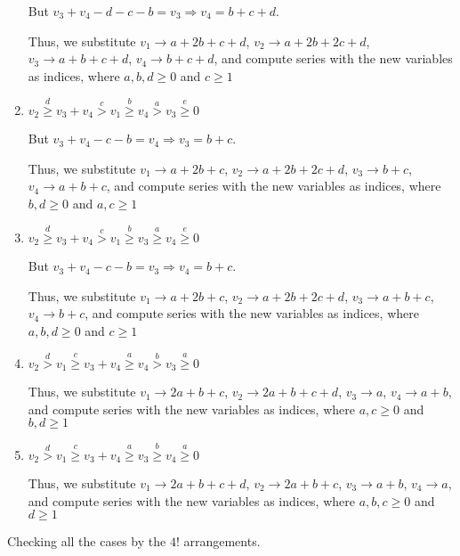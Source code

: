\documentclass{article}
\begin{document}
\begin{enumerate}
But $v_3+v_4-d-c-b=v_3\Rightarrow{v_4=b+c+d}.$

Thus, we substitute $v_1\rightarrow{a+2b+c+d}$, $v_2\rightarrow{a+2b+2c+d}$, $v_3\rightarrow{a+b+c+d}$, $v_4\rightarrow{b+c+d}$, and compute series with the new variables as indices, where $a,b,d\geq{0}$ and $c\geq{1}$
    \item 
$v_2\overset{d}{\geq}v_3+v_4\overset{c}{>}v_1\overset{b}{\geq}{v_4}\overset{a}{>}v_3\overset{e}{\geq}{0}$

But $v_3+v_4-c-b=v_4\Rightarrow{v_3=b+c}.$

Thus, we substitute $v_1\rightarrow{a+2b+c}$, $v_2\rightarrow{a+2b+2c+d}$, $v_3\rightarrow{b+c}$, $v_4\rightarrow{a+b+c}$, and compute series with the new variables as indices, where $b,d\geq{0}$ and $a,c\geq{1}$
    \item 
$v_2\overset{d}{\geq}v_3+v_4\overset{c}{>}v_1\overset{b}{\geq}{v_3}\overset{a}{\geq}v_4\overset{e}{\geq}{0}$

But $v_3+v_4-c-b=v_3\Rightarrow{v_4=b+c}.$

Thus, we substitute $v_1\rightarrow{a+2b+c}$, $v_2\rightarrow{a+2b+2c+d}$, $v_3\rightarrow{a+b+c}$, $v_4\rightarrow{b+c}$, and compute series with the new variables as indices, where $a,b,d\geq{0}$ and $c\geq{1}$
    \item 
$v_2\overset{d}{>}v_1\overset{c}{\geq}v_3+v_4\overset{a}{\geq}{v_4}\overset{b}{>}v_3\overset{a}{\geq}{0}$

Thus, we substitute 
$v_1\rightarrow{2a+b+c}$, 
$v_2\rightarrow{2a+b+c+d}$, 
$v_3\rightarrow{a}$, 
$v_4\rightarrow{a+b}$, and compute series with the new variables as indices, where $a,c\geq{0}$ and $b,d\geq{1}$
    \item 
$v_2\overset{d}{>}v_1\overset{c}{\geq}v_3+v_4\overset{a}{\geq}{v_3}\overset{b}{\geq}v_4\overset{a}{\geq}{0}$

Thus, we substitute 
$v_1\rightarrow{2a+b+c+d}$, 
$v_2\rightarrow{2a+b+c}$, 
$v_3\rightarrow{a+b}$, 
$v_4\rightarrow{a}$, and compute series with the new variables as indices, where $a,b,c\geq{0}$ and $d\geq{1}$
\end{enumerate}


Checking all the cases by the $4!$ arrangements.
\end{document}
